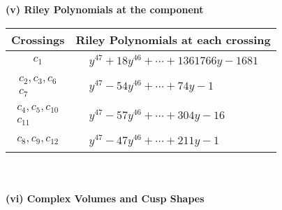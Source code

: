 \documentclass[1p]{elsarticle_modified}
\theoremstyle{definition}
\begin{document}
\newpage\renewcommand{\arraystretch}{1}
\flushleft \textbf{(v) Riley Polynomials at the component}\newline \\
\begin{tabular}{m{50pt}|m{274pt}}
Crossings & \hspace{64pt}Riley Polynomials at each crossing \\
\hline $$\begin{aligned}c_{1}\end{aligned}$$&$\begin{aligned}
&y^{47}+18 y^{46}+\cdots+1361766 y-1681
\end{aligned}$\\
\hline $$\begin{aligned}c_{2},c_{3},c_{6}\\c_{7}\end{aligned}$$&$\begin{aligned}
&y^{47}-54 y^{46}+\cdots+74 y-1
\end{aligned}$\\
\hline $$\begin{aligned}c_{4},c_{5},c_{10}\\c_{11}\end{aligned}$$&$\begin{aligned}
&y^{47}-57 y^{46}+\cdots+304 y-16
\end{aligned}$\\
\hline $$\begin{aligned}c_{8},c_{9},c_{12}\end{aligned}$$&$\begin{aligned}
&y^{47}-47 y^{46}+\cdots+211 y-1
\end{aligned}$\\
\hline
\end{tabular}\\~\\
\newpage\flushleft \textbf{(vi) Complex Volumes and Cusp Shapes}
\end{document}
